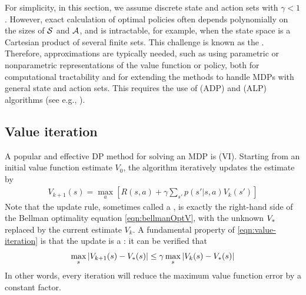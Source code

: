 For simplicity, in this section, we assume
discrete state and action sets with $\gamma<1$.
However,
exact calculation of optimal policies often depends
polynomially on the sizes of $\mathcal{S}$ and $\mathcal{A}$,
and is intractable, for example, when the state space
is a Cartesian product of several finite sets.
This challenge is known as the
.
Therefore, approximations are typically needed,
such as using parametric or nonparametric representations of the value function or policy,
both for computational tractability and
for extending the methods to handle MDPs
with general state and action sets.
This requires the use of
 (ADP)
and  (ALP)
algorithms (see e.g., \cite{BertsekasRL}).


\subsection{Value iteration}
\label{sec:valueIter}
\label{sec:VI}

A popular and effective DP method for solving an MDP is
 (VI).
Starting from an initial value function estimate $V_0$, the algorithm
iteratively updates the estimate by 
\begin{align}
\label{eqn:value-iteration}
V_{k+1}(s) = \max_a \left[
  R(s,a) + \gamma \sum_{s'} p(s'|s,a) V_k(s') \right]
\end{align}
Note that the update rule, sometimes called a
,
is exactly the right-hand side of the Bellman optimality equation \cref{eqn:bellmanOptV}, with the unknown $V_{*}$ replaced by the current estimate $V_k$.
A fundamental property of \cref{eqn:value-iteration}
is that the update is a :
it can be verified that
\begin{align}
\label{eqn:bellman-contraction}
\max_s |V_{k+1}(s) - V_{*}(s)| \le \gamma \max_s |V_k(s) - V_{*}(s)|
\end{align}
In other words, every iteration will reduce
the maximum value function error
by a constant factor.

